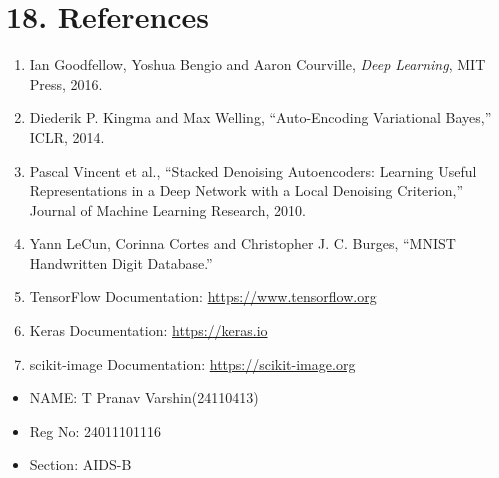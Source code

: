 \documentclass[10pt]{article}
\begin{document}
\section*{18. References}
\begin{enumerate}
\item Ian Goodfellow, Yoshua Bengio and Aaron Courville, \textit{Deep Learning}, MIT Press, 2016.
\item Diederik P. Kingma and Max Welling, ``Auto-Encoding Variational Bayes,'' ICLR, 2014.
\item Pascal Vincent et al., ``Stacked Denoising Autoencoders: Learning Useful Representations in a Deep Network with a Local Denoising Criterion,'' Journal of Machine Learning Research, 2010.
\item Yann LeCun, Corinna Cortes and Christopher J. C. Burges, ``MNIST Handwritten Digit Database.''
\item TensorFlow Documentation: \url{https://www.tensorflow.org}
\item Keras Documentation: \url{https://keras.io}
\item scikit-image Documentation: \url{https://scikit-image.org}
\end{enumerate}

\vspace{10mm}

\begin{itemize}
    \item NAME: T Pranav Varshin(24110413)
    \item Reg No: 24011101116
    \item Section: AIDS-B
\end{itemize}
\end{document}
